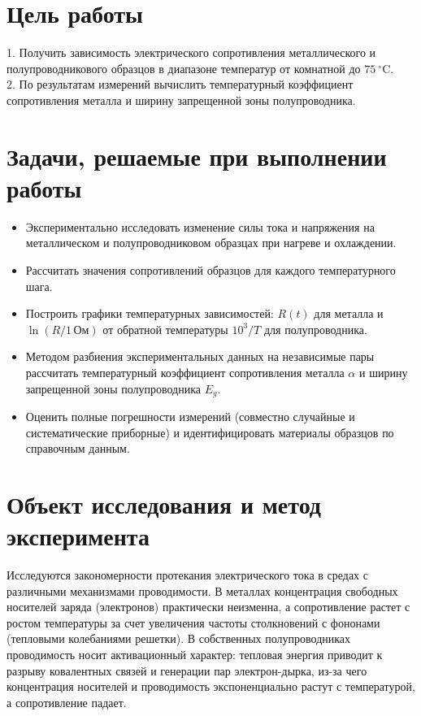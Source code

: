 \documentclass[12pt]{article}
\begin{document}
\setcounter{page}{2}

\newpage
\tableofcontents
\newpage

\section{Цель работы}
1. Получить зависимость электрического сопротивления металлического и полупроводникового образцов в диапазоне температур от комнатной до $75~^{\circ}\text{C}$.\\

2. По результатам измерений вычислить температурный коэффициент сопротивления металла и ширину запрещенной зоны полупроводника.

\section{Задачи, решаемые при выполнении работы}
\begin{itemize}
    \item Экспериментально исследовать изменение силы тока и напряжения на металлическом и полупроводниковом образцах при нагреве и охлаждении.
    \item Рассчитать значения сопротивлений образцов для каждого температурного шага.
    \item Построить графики температурных зависимостей: $R(t)$ для металла и $\ln (R / 1\,\text{Ом})$ от обратной температуры $10^3/T$ для полупроводника.
    \item Методом разбиения экспериментальных данных на независимые пары рассчитать температурный коэффициент сопротивления металла $\alpha$ и ширину запрещенной зоны полупроводника $E_g$.
    \item Оценить полные погрешности измерений (совместно случайные и систематические приборные) и идентифицировать материалы образцов по справочным данным.
\end{itemize}

\section{Объект исследования и метод эксперимента}
Исследуются закономерности протекания электрического тока в средах с различными механизмами проводимости. В металлах концентрация свободных носителей заряда (электронов) практически неизменна, а сопротивление растет с ростом температуры за счет увеличения частоты столкновений с фононами (тепловыми колебаниями решетки). В собственных полупроводниках проводимость носит активационный характер: тепловая энергия приводит к разрыву ковалентных связей и генерации пар электрон-дырка, из-за чего концентрация носителей и проводимость экспоненциально растут с температурой, а сопротивление падает.
\end{document}
